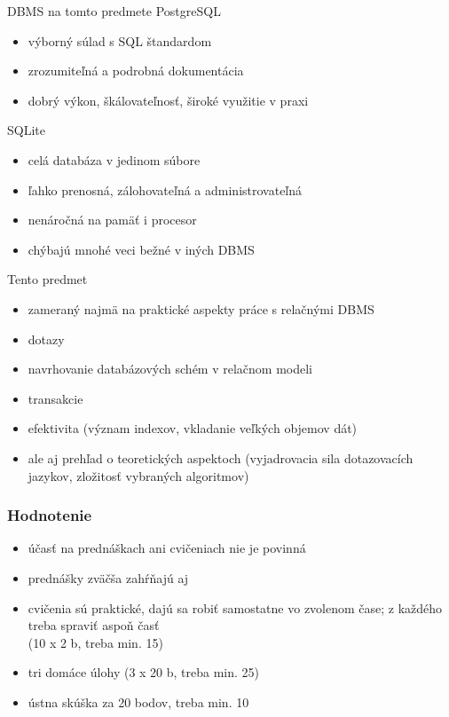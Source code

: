 \documentclass[12pt]{beamer}
\begin{document}
\begin{frame}{DBMS na tomto predmete}
PostgreSQL
\begin{itemize}
\item výborný súlad s SQL štandardom
\item zrozumiteľná a podrobná dokumentácia
\item dobrý výkon, škálovateľnosť, široké využitie v praxi
\end{itemize}
\bigskip

SQLite
\begin{itemize}
\item celá databáza v jedinom súbore
\item ľahko prenosná, zálohovateľná a administrovateľná
\item nenáročná na pamäť i procesor
\item chýbajú mnohé veci bežné v iných DBMS
\end{itemize}
\end{frame}

\begin{frame}{Tento predmet}
\begin{itemize}
\item zameraný najmä na praktické aspekty práce s relačnými DBMS
\item dotazy
\item navrhovanie databázových schém v relačnom modeli
\item transakcie
\item efektivita (význam indexov, vkladanie veľkých objemov dát)
\pause
\item ale aj prehľad o teoretických aspektoch (vyjadrovacia sila dotazovacích jazykov, zložitosť vybraných algoritmov)
\end{itemize}
\end{frame}

\begin{frame}
\frametitle{Hodnotenie}
\begin{itemize}
\item účasť na prednáškach ani cvičeniach nie je povinná
\item prednášky zväčša zahŕňajú aj 
\item cvičenia sú praktické, dajú sa robiť samostatne vo zvolenom čase; z každého treba spraviť aspoň časť\\ (10 x 2 b, treba min. 15)
\item tri domáce úlohy (3 x 20 b, treba min. 25)
\item ústna skúška za 20 bodov, treba min. 10
\end{itemize}
\end{frame}
\end{document}
